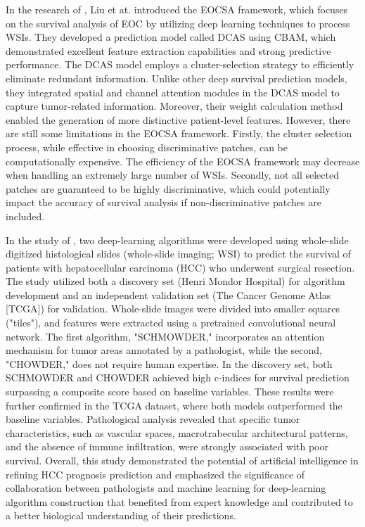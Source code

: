 \documentclass[journal,twoside,web]{ieeecolor}
\begin{document}
In the research of \cite{liu2022eocsa}, Liu et at. introduced the EOCSA framework, which focuses on the survival analysis of EOC by utilizing deep learning techniques to process WSIs. 
They developed a prediction model called DCAS using CBAM\cite{woo2018cbam}, which demonstrated excellent feature extraction capabilities and strong predictive performance. 
The DCAS model employs a cluster-selection strategy to efficiently eliminate redundant information. 
Unlike other deep survival prediction models, they integrated spatial and channel attention modules in the DCAS model to capture tumor-related information. 
Moreover, their weight calculation method enabled the generation of more distinctive patient-level features. 
However, there are still some limitations in the EOCSA framework. 
Firstly, the cluster selection process, while effective in choosing discriminative patches, can be computationally expensive. 
The efficiency of the EOCSA framework may decrease when handling an extremely large number of WSIs. Secondly, not all selected patches are guaranteed to be highly discriminative, which could potentially impact the accuracy of survival analysis if non-discriminative patches are included. 

In the study of \cite{saillard2020predicting}, two deep-learning algorithms were developed using whole-slide digitized histological slides (whole-slide imaging; WSI) to predict the survival of patients with hepatocellular carcinoma (HCC) who underwent surgical resection. 
The study utilized both a discovery set (Henri Mondor Hospital) for algorithm development and an independent validation set (The Cancer Genome Atlas [TCGA]) for validation. 
Whole-slide images were divided into smaller squares ("tiles"), and features were extracted using a pretrained convolutional neural network. 
The first algorithm, "SCHMOWDER," incorporates an attention mechanism for tumor areas annotated by a pathologist, while the second, "CHOWDER," does not require human expertise.
In the discovery set, both SCHMOWDER and CHOWDER achieved high c-indices for survival prediction surpassing a composite score based on baseline variables. 
These results were further confirmed in the TCGA dataset, where both models outperformed the baseline variables. 
Pathological analysis revealed that specific tumor characteristics, such as vascular spaces, macrotrabecular architectural patterns, and the absence of immune infiltration, were strongly associated with poor survival. 
Overall, this study demonstrated the potential of artificial intelligence in refining HCC prognosis prediction and emphasized the significance of collaboration between pathologists and machine learning for deep-learning algorithm construction that benefited from expert knowledge and contributed to a better biological understanding of their predictions.
\end{document}
